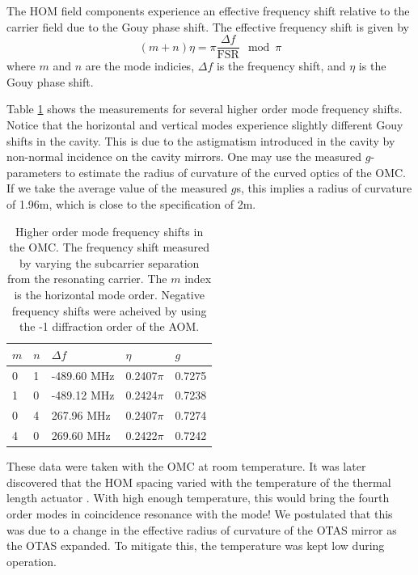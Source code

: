 The HOM field components experience an effective frequency shift relative to the  carrier field due to the Gouy phase shift. %
The effective frequency shift is given by
\begin{equation}
\label{eqn:gouyshift}
(m+n)\eta=\pi\frac{\Delta f}{\mathrm{FSR}}\mod \pi
\end{equation}
where $m$ and $n$ are the  mode indicies, $\Delta f$ is the frequency shift, and $\eta$ is the Gouy phase shift. %


Table \ref{tab:HOM} shows the measurements for several higher order mode frequency shifts. %
Notice that the horizontal and vertical modes experience slightly different Gouy shifts in the cavity. %
This is due to the astigmatism introduced in the cavity by non-normal incidence on the cavity mirrors. %
One may use the measured $g$-parameters to estimate the radius of curvature of the curved optics of the OMC. %
If we take the average value of the measured $g$s, this implies a radius of curvature of 1.96m, which is close to the specification of 2m.

\begin{table}
  \begin{center}
    \begin{tabular}{lll|ll}
      \hline
      $m$ & $n$ & $\Delta f$ & $\eta$ & $g$ \\
      \hline
      0 & 1 & -489.60 MHz & 0.2407$\pi$ & 0.7275\\
      1 & 0 & -489.12 MHz & 0.2424$\pi$ & 0.7238\\
      0 & 4 &  267.96 MHz & 0.2407$\pi$ & 0.7274\\
      4 & 0 &  269.60 MHz & 0.2422$\pi$ & 0.7242\\
      \hline
    \end{tabular}
  \caption[Higher order mode frequency shifts in the OMC]{Higher order mode frequency shifts in the OMC. The frequency shift measured by varying the subcarrier separation from the resonating carrier. The $m$ index is the horizontal mode order. Negative frequency shifts were acheived by using the -1 diffraction order of the AOM.}
  \label{tab:HOM}
  \end{center}
\end{table}

These data were taken with the OMC at room temperature. %
It was later discovered that the HOM spacing varied with the temperature of the thermal length actuator \cite{OTASmodes}. %
With high enough temperature, this would bring the fourth order modes in coincidence resonance with the  mode! %
We postulated that this was due to a change in the effective radius of curvature of the OTAS mirror as the OTAS expanded. %
To mitigate this, the temperature was kept low during operation.

